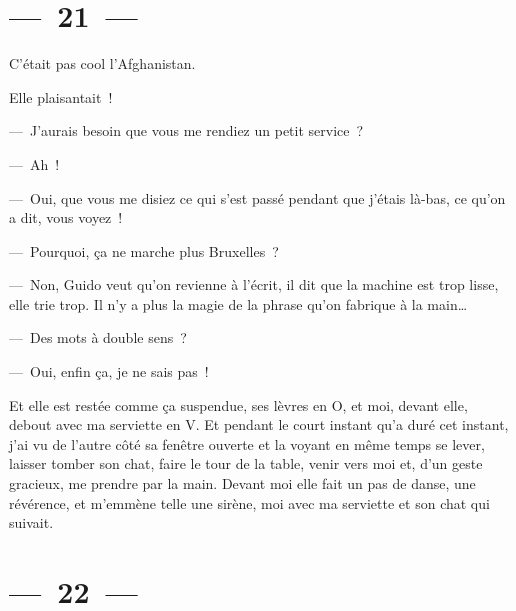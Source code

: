 \documentclass[french,twoside]{book} %
\begin{document}
\section[{— 21 —}]{— 21 —}
\renewcommand{\leftmark}{— 21 —}

C’était pas cool l’Afghanistan.\par
Elle plaisantait !\par
— J’aurais besoin que vous me rendiez un petit service ?\par
— Ah !\par
— Oui, que vous me disiez ce qui s’est passé pendant que j’étais là-bas, ce qu’on a dit, vous voyez !\par
— Pourquoi, ça ne marche plus Bruxelles ?\par
— Non, Guido veut qu’on revienne à l’écrit, il dit que la machine est trop lisse, elle trie trop. Il n’y a plus la magie de la phrase qu’on fabrique à la main…\par
— Des mots à double sens ?\par
— Oui, enfin ça, je ne sais pas !\par
Et elle est restée comme ça suspendue, ses lèvres en O, et moi, devant elle, debout avec ma serviette en V. Et pendant le court instant qu’a duré cet instant, j’ai vu de l’autre côté sa fenêtre ouverte et la voyant en même temps se lever, laisser tomber son chat, faire le tour de la table, venir vers moi et, d’un geste gracieux, me prendre par la main. Devant moi elle fait un pas de danse, une révérence, et m’emmène telle une sirène, moi avec ma serviette et son chat qui suivait.

\section[{— 22 —}]{— 22 —}
\renewcommand{\leftmark}{— 22 —}
\end{document}
